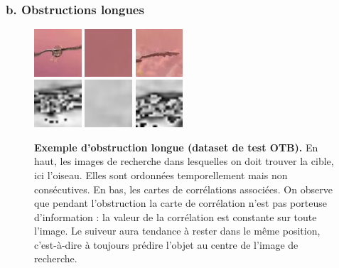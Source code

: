 \documentclass[10pt,twocolumn,letterpaper,french]{article}
\begin{document}
\subsubsection*{b. Obstructions longues}
\label{obstructions}

\begin{figure}[!h]
  \centering
  \includegraphics[width=50pt]{images/vids/bird/search/000117.png}
  \includegraphics[width=50pt]{images/vids/bird/search/000162.png}
  \includegraphics[width=50pt]{images/vids/bird/search/000186.png}\\
  \includegraphics[width=50pt]{images/vids/bird/pre-corr/000117.png}
  \includegraphics[width=50pt]{images/vids/bird/pre-corr/000162.png}
  \includegraphics[width=50pt]{images/vids/bird/pre-corr/000186.png} 
  \caption{\textbf{Exemple d'obstruction longue (dataset de test OTB).} En haut, les images de recherche dans lesquelles on doit trouver la cible, ici l'oiseau. Elles sont ordonnées temporellement mais non consécutives. En bas, les cartes de corrélations associées. On observe que pendant l'obstruction la carte de corrélation n'est pas porteuse d'information : la valeur de la corrélation est constante sur toute l'image. Le suiveur aura tendance à rester dans le même position, c'est-à-dire à toujours prédire l'objet au centre de l'image de recherche.}
  \label{obstruct}
  \end{figure}
\end{document}
